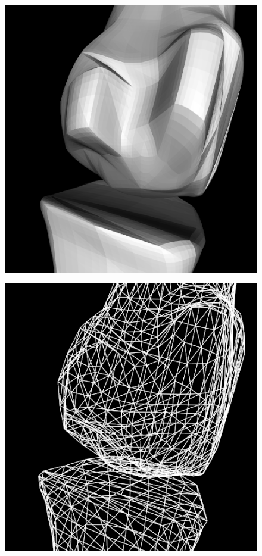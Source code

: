 \documentclass[10pt, conference, compsocconf]{IEEEtran}
\begin{document}
\begin{figure}[htbp]
{\begin{minipage}[h]{0.16\linewidth}
        \includegraphics[width=\textwidth]{./Figure/footbones/fingerBones/weight23.png}\vspace{1ex}\\
      \end{minipage}%
      \begin{minipage}[h]{0.16\linewidth}
        \centering
        \includegraphics[width=\textwidth]{./Figure/footbones/fingerBones/weight21-.png}\\

\end{minipage}}
\end{figure}
\end{document}
